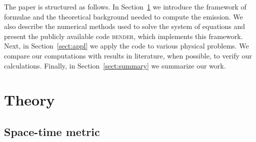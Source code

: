 \documentclass{aa}
\newcommand{\refedel}[1]{}
\begin{document}
The paper is structured as follows.
In Section~\ref{sect:theory} we introduce the framework of formulae and the theoretical background needed to compute the emission.
We also describe the numerical methods used to solve the system of equations and present the publicly available code \textsc{bender},%
which implements this framework.
Next, in Section~\ref{sect:appl} we apply the code to various physical problems. \refedel{, mostly related to AMPs.}
We compare our computations with results in literature, when possible, to verify our calculations.
Finally, in Section~\ref{sect:summary} we summarize our work.




\section{Theory}\label{sect:theory}
\subsection{Space-time metric}\label{sect:spacetime}
\end{document}
